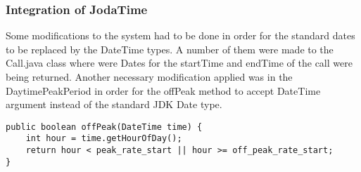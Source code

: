 \subsubsection{Integration of JodaTime}
Some modifications to the system had to be done in order for the standard dates to be replaced by the DateTime types. A number of them were made to the Call.java class where were Dates for the startTime and endTime of the call were being returned. Another necessary modification applied was in the DaytimePeakPeriod in order for the offPeak method to accept DateTime argument instead of the standard JDK Date type.
\begin{lstlisting}
public boolean offPeak(DateTime time) {     
	int hour = time.getHourOfDay();
	return hour < peak_rate_start || hour >= off_peak_rate_start;
}
\end{lstlisting}
